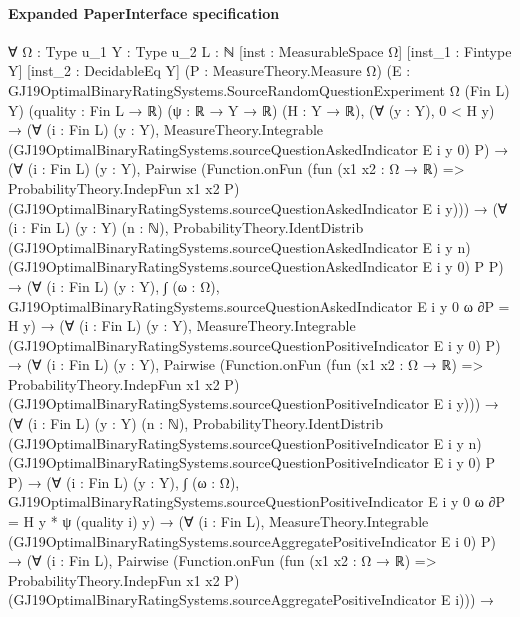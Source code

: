 \documentclass[10pt]{article}
\begin{document}
\paragraph{Expanded PaperInterface specification}
\begin{ReviewVerbatim}
∀ {Ω : Type u_1} {Y : Type u_2} {L : ℕ} [inst : MeasurableSpace Ω] [inst_1 : Fintype Y] [inst_2 : DecidableEq Y]
  (P : MeasureTheory.Measure Ω) (E : GJ19OptimalBinaryRatingSystems.SourceRandomQuestionExperiment Ω (Fin L) Y)
  (quality : Fin L → ℝ) (ψ : ℝ → Y → ℝ) (H : Y → ℝ),
  (∀ (y : Y), 0 < H y) →
    (∀ (i : Fin L) (y : Y),
        MeasureTheory.Integrable (GJ19OptimalBinaryRatingSystems.sourceQuestionAskedIndicator E i y 0) P) →
      (∀ (i : Fin L) (y : Y),
          Pairwise
            (Function.onFun (fun (x1 x2 : Ω → ℝ) => ProbabilityTheory.IndepFun x1 x2 P)
              (GJ19OptimalBinaryRatingSystems.sourceQuestionAskedIndicator E i y))) →
        (∀ (i : Fin L) (y : Y) (n : ℕ),
            ProbabilityTheory.IdentDistrib (GJ19OptimalBinaryRatingSystems.sourceQuestionAskedIndicator E i y n)
              (GJ19OptimalBinaryRatingSystems.sourceQuestionAskedIndicator E i y 0) P P) →
          (∀ (i : Fin L) (y : Y),
              ∫ (ω : Ω), GJ19OptimalBinaryRatingSystems.sourceQuestionAskedIndicator E i y 0 ω ∂P = H y) →
            (∀ (i : Fin L) (y : Y),
                MeasureTheory.Integrable (GJ19OptimalBinaryRatingSystems.sourceQuestionPositiveIndicator E i y 0) P) →
              (∀ (i : Fin L) (y : Y),
                  Pairwise
                    (Function.onFun (fun (x1 x2 : Ω → ℝ) => ProbabilityTheory.IndepFun x1 x2 P)
                      (GJ19OptimalBinaryRatingSystems.sourceQuestionPositiveIndicator E i y))) →
                (∀ (i : Fin L) (y : Y) (n : ℕ),
                    ProbabilityTheory.IdentDistrib
                      (GJ19OptimalBinaryRatingSystems.sourceQuestionPositiveIndicator E i y n)
                      (GJ19OptimalBinaryRatingSystems.sourceQuestionPositiveIndicator E i y 0) P P) →
                  (∀ (i : Fin L) (y : Y),
                      ∫ (ω : Ω), GJ19OptimalBinaryRatingSystems.sourceQuestionPositiveIndicator E i y 0 ω ∂P =
                        H y * ψ (quality i) y) →
                    (∀ (i : Fin L),
                        MeasureTheory.Integrable (GJ19OptimalBinaryRatingSystems.sourceAggregatePositiveIndicator E i 0)
                          P) →
                      (∀ (i : Fin L),
                          Pairwise
                            (Function.onFun (fun (x1 x2 : Ω → ℝ) => ProbabilityTheory.IndepFun x1 x2 P)
                              (GJ19OptimalBinaryRatingSystems.sourceAggregatePositiveIndicator E i))) →

\end{ReviewVerbatim}
\end{document}
